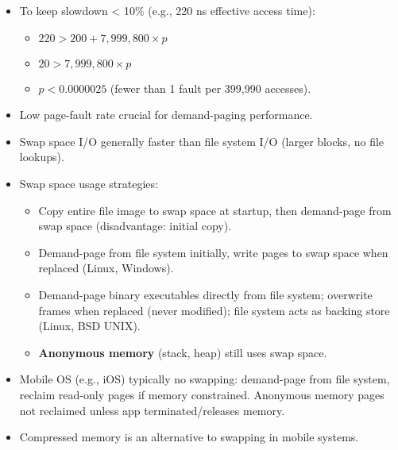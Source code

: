 \begin{itemize}
    \item To keep slowdown < 10\% (e.g., 220 ns effective access time):
    \begin{itemize}
        \item $220 > 200 + 7,999,800 \times p$
        \item $20 > 7,999,800 \times p$
        \item $p < 0.0000025$ (fewer than 1 fault per 399,990 accesses).
    \end{itemize}
    \item Low page-fault rate crucial for demand-paging performance.
    \item Swap space I/O generally faster than file system I/O (larger blocks, no file lookups).
    \item Swap space usage strategies:
    \begin{itemize}
        \item Copy entire file image to swap space at startup, then demand-page from swap space (disadvantage: initial copy).
        \item Demand-page from file system initially, write pages to swap space when replaced (Linux, Windows).
        \item Demand-page binary executables directly from file system; overwrite frames when replaced (never modified); file system acts as backing store (Linux, BSD UNIX).
        \item \textbf{Anonymous memory} (stack, heap) still uses swap space.
    \end{itemize}
    \item Mobile OS (e.g., iOS) typically no swapping: demand-page from file system, reclaim read-only pages if memory constrained. Anonymous memory pages not reclaimed unless app terminated/releases memory.
    \item Compressed memory is an alternative to swapping in mobile systems.
\end{itemize}

